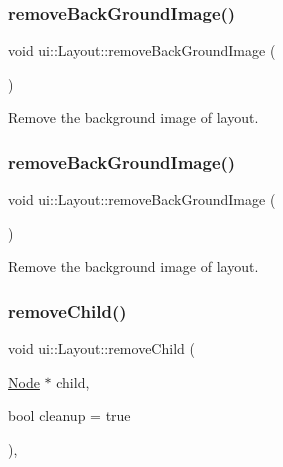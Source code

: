 \mbox{\label{classui_1_1Layout_a5ccd3cef17fe9ae4ed0d76f2d07a96ce}} 
\subsubsection{\texorpdfstring{remove\+Back\+Ground\+Image()}{removeBackGroundImage()}\hspace{0.1cm}{\footnotesize\ttfamily [1/2]}}
{\footnotesize\ttfamily void ui\+::\+Layout\+::remove\+Back\+Ground\+Image (\begin{DoxyParamCaption}{ }\end{DoxyParamCaption})}

Remove the background image of layout. \mbox{\label{classui_1_1Layout_a5ccd3cef17fe9ae4ed0d76f2d07a96ce}} 
\subsubsection{\texorpdfstring{remove\+Back\+Ground\+Image()}{removeBackGroundImage()}\hspace{0.1cm}{\footnotesize\ttfamily [2/2]}}
{\footnotesize\ttfamily void ui\+::\+Layout\+::remove\+Back\+Ground\+Image (\begin{DoxyParamCaption}{ }\end{DoxyParamCaption})}

Remove the background image of layout. \mbox{\label{classui_1_1Layout_a13d675c669b6b926956baf484ce0857a}} 
\subsubsection{\texorpdfstring{remove\+Child()}{removeChild()}\hspace{0.1cm}{\footnotesize\ttfamily [1/2]}}
{\footnotesize\ttfamily void ui\+::\+Layout\+::remove\+Child (\begin{DoxyParamCaption}\item[{\hyperlink{classNode}{Node} $\ast$}]{child,  }\item[{bool}]{cleanup = {\ttfamily true} }\end{DoxyParamCaption})\hspace{0.3cm}{\ttfamily [override]}, {\ttfamily [virtual]}}

